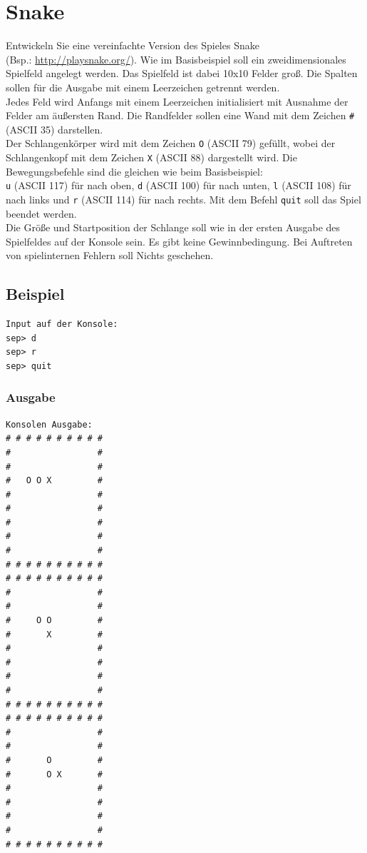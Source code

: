 \documentclass[a4paper,10pt]{article}
\begin{document}
\section*{Snake}

Entwickeln Sie eine vereinfachte Version des Spieles Snake\\ (Bsp.: \url{http://playsnake.org/}).
Wie im Basisbeispiel soll ein zweidimensionales Spielfeld angelegt werden. Das Spielfeld ist dabei
10x10 Felder groß. Die Spalten sollen für die Ausgabe mit einem Leerzeichen getrennt werden.\\
Jedes Feld wird Anfangs mit einem Leerzeichen initialisiert mit Ausnahme der Felder
am äußersten Rand. Die Randfelder sollen eine Wand mit dem Zeichen \texttt{\#} (ASCII 35) darstellen.\\
Der Schlangenkörper wird mit dem Zeichen \texttt{O} (ASCII 79) gefüllt, wobei der Schlangenkopf mit dem Zeichen 
\texttt{X} (ASCII 88) dargestellt wird. Die Bewegungsbefehle sind die gleichen wie beim Basisbeispiel:\\
\texttt{u} (ASCII 117) für nach oben, \texttt{d} (ASCII 100) für nach unten, \texttt{l} (ASCII 108) für nach links und 
\texttt{r} (ASCII 114) für nach rechts. Mit dem Befehl \texttt{quit} soll das Spiel beendet werden.\\
Die Größe und Startposition der Schlange soll wie in der ersten Ausgabe des Spielfeldes auf der Konsole sein.
Es gibt keine Gewinnbedingung. Bei Auftreten von spielinternen Fehlern soll Nichts geschehen.


\begin{multicols}{2}

\subsection*{Beispiel}
\begin{verbatim}
Input auf der Konsole: 
sep> d
sep> r
sep> quit
\end{verbatim}

\subsubsection*{Ausgabe}

\begin{verbatim}
Konsolen Ausgabe:
# # # # # # # # # # 
#                 # 
#                 # 
#   O O X         # 
#                 # 
#                 # 
#                 # 
#                 # 
#                 # 
# # # # # # # # # # 
# # # # # # # # # # 
#                 # 
#                 # 
#     O O         # 
#       X         # 
#                 # 
#                 # 
#                 # 
#                 # 
# # # # # # # # # # 
# # # # # # # # # # 
#                 # 
#                 # 
#       O         # 
#       O X       # 
#                 # 
#                 # 
#                 # 
#                 # 
# # # # # # # # # # 
\end{verbatim}

\end{multicols}
\end{document}
